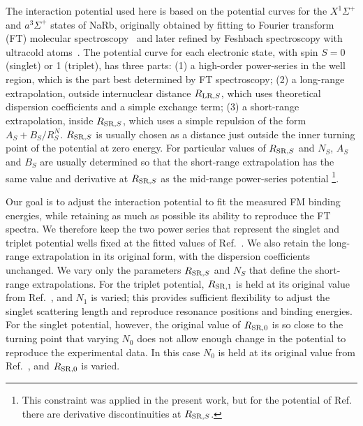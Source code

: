 The interaction potential used here is based on the potential curves for the $X^1\Sigma^+$ and $a^3\Sigma^+$ states of NaRb, originally obtained by fitting to Fourier transform (FT) molecular spectroscopy~\cite{Pashov2005} and later refined by Feshbach spectroscopy with ultracold atoms~\cite{wang2013observation}. The potential curve for each electronic state, with spin $S=0$ (singlet) or 1 (triplet), has three parts: (1) a high-order power-series in the well region, which is the part best determined by FT spectroscopy; (2) a long-range extrapolation, outside internuclear distance $R_{{\rm LR},S}$, which uses theoretical dispersion coefficients and a simple exchange term; (3) a short-range extrapolation, inside $R_{{\rm SR},S}$, which uses a simple repulsion of the form $A_S + B_S/R^N_S$. $R_{{\rm SR},S}$ is usually chosen as a distance just outside the inner turning point of the potential at zero energy. For particular values of $R_{{\rm SR},S}$ and $N_S$, $A_S$ and $B_S$ are usually determined so that the short-range extrapolation has the same value and derivative at $R_{{\rm SR},S}$ as the mid-range power-series potential \footnote{This constraint was applied in the present work, but for the potential of Ref.\ \cite{wang2013observation} there are derivative discontinuities at $R_{{\rm SR},S}$.}.

Our goal is to adjust the interaction potential to fit the measured FM binding energies, while retaining as much as possible its ability to reproduce the FT spectra. We therefore keep the two power series that represent the singlet and triplet potential wells fixed at the fitted values of Ref.\ \cite{wang2013observation}. We also retain the long-range extrapolation in its original form, with the dispersion coefficients unchanged. We vary only the parameters $R_{{\rm SR},S}$ and $N_S$ that define the short-range extrapolations. For the triplet potential, $R_{{\rm SR},1}$ is held at its original value from Ref.\ \cite{wang2013observation}, and $N_1$ is varied; this provides sufficient flexibility to adjust the singlet scattering length and reproduce resonance positions and binding energies. For the singlet potential, however, the original value of $R_{{\rm SR},0}$ is so close to the turning point that varying $N_0$ does not allow enough change in the potential to reproduce the experimental data. In this case $N_0$ is held at its original value from Ref.\ \cite{wang2013observation}, and $R_{{\rm SR},0}$ is varied.

